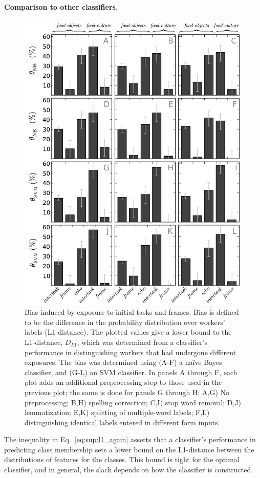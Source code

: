 \documentclass[12pt]{article}
\begin{document}
\paragraph{Comparison to other classifiers.} 

\begin{figure}
	\centering
	\includegraphics[scale=0.75]{figs/theta_sup.pdf}
	\caption{
		Bias induced by exposure to initial tasks and frames.
		Bias is defined to be the difference in the probability 
		distribution over workers' labels (L1-distance).  The plotted values
		give a lower bound to the L1-distance, $D_{L1}^-$, which was 
		determined from a classifier's performance in 
		distinguishing workers that had undergone different exposures.
		The bias was determined using (A-F) a na\"ive Bayes classifier, and 
		(G-L) an SVM classifier.
		In panels A through F, each plot adds an additional
		preprocessing step to those used in the previous plot; the same is 
		done for panels G through H: A,G) No 
		preprocessing; B,H) spelling correction; C,I) stop word removal; 
		D,J) lemmatization; E,K) splitting of multiple-word labels; 
		F,L) distinguishing identical labels entered in different form inputs.
	}
	\label{fig:theta_sup}
\end{figure}
The inequality in Eq.~\ref{eq:sup:l1_again}
asserts that a classifier's performance in predicting class membership
sets a lower bound on the L1-distance between the distributions of features 
for the classes.
This bound is tight for the optimal classifier, and in general, the slack
depends on how the classifier is constructed.
\end{document}
